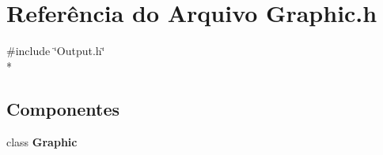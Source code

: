 \section{Referência do Arquivo Graphic.\+h}
\label{_graphic_8h}
{\ttfamily \#include \char`\"{}Output.\+h\char`\"{}}\\*
\subsection*{Componentes}
\begin{DoxyCompactItemize}
\item 
class {\bf Graphic}
\end{DoxyCompactItemize}

